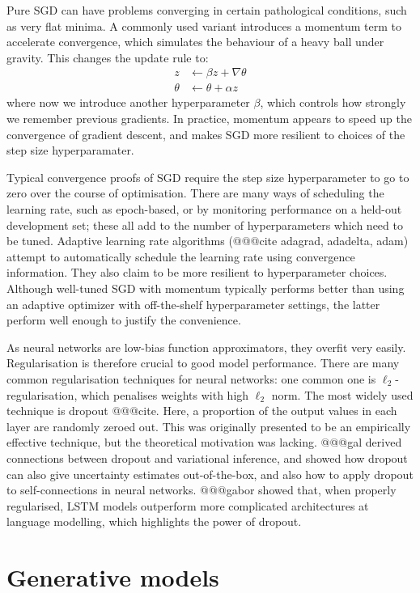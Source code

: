 Pure SGD can have problems converging in certain pathological conditions, such as very flat minima. A commonly used variant introduces a momentum term to accelerate convergence, which simulates the behaviour of a heavy ball under gravity. This changes the update rule to:
\begin{align}
    z &\leftarrow \beta z + \nabla \theta \\
    \theta &\leftarrow \theta + \alpha z
\end{align}
where now we introduce another hyperparameter $\beta$, which controls how strongly we remember previous gradients. In practice, momentum appears to speed up the convergence of gradient descent, and makes SGD more resilient to choices of the step size hyperparamater.

Typical convergence proofs of SGD require the step size hyperparameter to go to zero over the course of optimisation. There are many ways of scheduling the learning rate, such as epoch-based, or by monitoring performance on a held-out development set; these all add to the number of hyperparameters which need to be tuned. Adaptive learning rate algorithms (@@@cite adagrad, adadelta, adam) attempt to automatically schedule the learning rate using convergence information. They also claim to be more resilient to hyperparameter choices. Although well-tuned SGD with momentum typically performs better than using an adaptive optimizer with off-the-shelf hyperparameter settings, the latter perform well enough to justify the convenience.

As neural networks are low-bias function approximators, they overfit very easily. Regularisation is therefore crucial to good model performance. There are many common regularisation techniques for neural networks: one common one is $\ell_2$-regularisation, which penalises weights with high $\ell_2$ norm. The most widely used technique is dropout @@@cite. Here, a proportion of the output values in each layer are randomly zeroed out. This was originally presented to be an empirically effective technique, but the theoretical motivation was lacking. @@@gal derived connections between dropout and variational inference, and showed how dropout can also give uncertainty estimates out-of-the-box, and also how to apply dropout to self-connections in neural networks. @@@gabor showed that, when properly regularised, LSTM models outperform more complicated architectures at language modelling, which highlights the power of dropout.

\section{Generative models}

